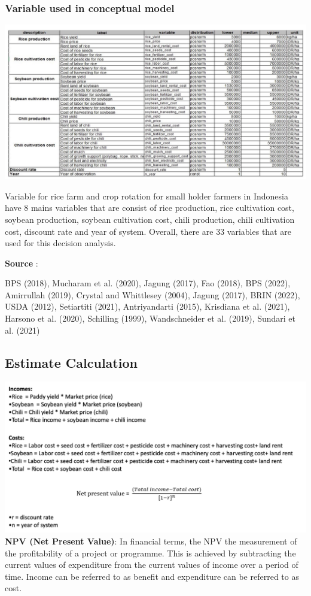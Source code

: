 \documentclass[
]{article}
\begin{document}
\hypertarget{variable-used-in-conceptual-model}{%
\subsubsection{Variable used in conceptual
model}\label{variable-used-in-conceptual-model}}

\includegraphics{Photo rice farm with crop rotation/Variable estimate.png}

Variable for rice farm and crop rotation for small holder farmers in
Indonesia have 8 mains variables that are consist of rice production,
rice cultivation cost, soybean production, soybean cultivation cost,
chili production, chili cultivation cost, discount rate and year of
system. Overall, there are 33 variables that are used for this decision
analysis.

\textbf{Source} :

BPS (2018), Mucharam et al. (2020), Jagung (2017), Fao (2018), BPS
(2022), Amirrullah (2019), Crystal and Whittlesey (2004), Jagung (2017),
BRIN (2022), USDA (2012), Setiartiti (2021), Antriyandarti (2015),
Krisdiana et al. (2021), Harsono et al. (2020), Schilling (1999),
Wandschneider et al. (2019), Sundari et al. (2021)

\hypertarget{estimate-calculation}{%
\subsection{Estimate Calculation}\label{estimate-calculation}}

\includegraphics{Photo rice farm with crop rotation/Estimate calculation.png}
\textbf{NPV (Net Present Value)}: In financial terms, the NPV the
measurement of the profitability of a project or programme. This is
achieved by subtracting the current values of expenditure from the
current values of income over a period of time. Income can be referred
to as benefit and expenditure can be referred to as cost.
\end{document}
